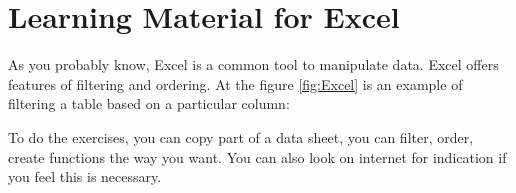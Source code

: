 \chapter{Learning Material for Excel}
\label{MaterialExcel}

As you probably know, Excel is a common tool to manipulate data. Excel offers features of filtering and ordering. At the figure \ref{fig:Excel} is an example of filtering a table based on a particular column:




To do the exercises, you can copy part of a data sheet, you can filter, order, create functions the way you want. You can also look on internet for indication if you feel this is necessary.
